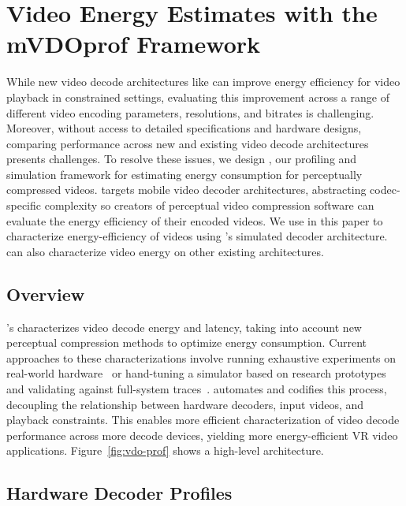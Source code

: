 \section{Video Energy Estimates with the {mVDOprof} Framework}
\label{sec:vdoprof}

While new video decode architectures like \nameArch can improve energy efficiency for video playback in constrained settings, evaluating this improvement across a range of different video encoding parameters, resolutions, and bitrates is challenging.
Moreover, without access to detailed specifications and hardware designs, comparing performance across new and existing video decode architectures presents challenges.
To resolve these issues, we design \nameArchprof, our profiling and simulation framework for estimating energy consumption for perceptually compressed videos.
\nameArchprof targets mobile video decoder architectures, abstracting codec-specific complexity so creators of perceptual video compression software can evaluate the energy efficiency of their encoded videos.
We use \nameArchprof in this paper to characterize energy-efficiency of videos using \nameArch's simulated decoder architecture. \nameArchprof can also characterize video energy on other existing architectures.


\subsection{\nameArchprof Overview}
\nameArchprof's characterizes video decode energy and latency, taking into account new perceptual compression methods to optimize energy consumption.
Current approaches to these characterizations involve running exhaustive experiments on real-world hardware~\cite{evr19isca} or hand-tuning a simulator based on research prototypes and validating against full-system traces~\cite{zhang2017race}.
\nameArchprof automates and codifies this process, decoupling the relationship between hardware decoders, input videos, and playback constraints.
This enables more efficient characterization of video decode performance across more decode devices, yielding more energy-efficient VR video applications.
Figure~\ref{fig:vdo-prof} shows a high-level \nameArchprof architecture.

\vdoprofOverview

\subsection{Hardware Decoder Profiles}
\label{subsec:profiles}

